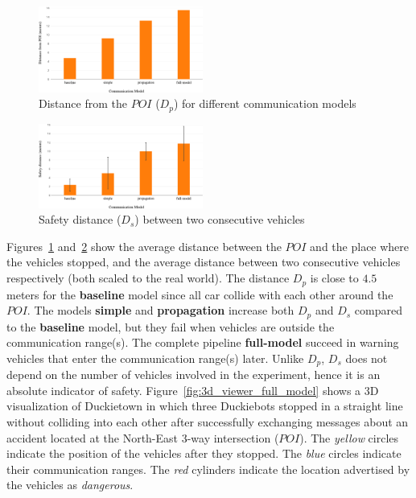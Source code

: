 \begin{figure}[t]
    \centering
    \includegraphics[width=0.48\textwidth, height=0.24\textwidth]{figures/distance_from_POI.pdf}
    \caption{Distance from the $POI$ ($D_p$) for different communication models \label{fig:distance_from_poi}}
\end{figure}

\begin{figure}[t]
    \centering
    \includegraphics[width=0.48\textwidth, height=0.24\textwidth]{figures/safety_distance.pdf}
    \caption{Safety distance ($D_s$) between two consecutive vehicles \label{fig:safety_distance}}
\end{figure}

Figures~\ref{fig:distance_from_poi} and~\ref{fig:safety_distance} show the average distance 
between the $POI$ and the place where the vehicles stopped, and the average distance 
between two consecutive vehicles respectively (both scaled to the real world).
The distance $D_p$ is close to $4.5$ meters for the \textbf{baseline} model since all car collide with each 
other around the $POI$. The models \textbf{simple} and \textbf{propagation} increase both 
$D_p$ and $D_s$ compared to the \textbf{baseline} model, but they fail when vehicles are outside the communication range(s).
The complete pipeline \textbf{full-model} succeed in warning vehicles that enter the communication range(s) later.
Unlike $D_p$, $D_s$ does not depend on the number of vehicles involved in the experiment, hence it 
is an absolute indicator of safety. Figure~\ref{fig:3d_viewer_full_model} shows a 3D visualization of Duckietown
in which three Duckiebots stopped in a straight line without colliding into each other
after successfully exchanging messages about an accident located at the North-East 3-way intersection ($POI$).
The \textit{yellow} circles indicate the position of the vehicles after they stopped. 
The \textit{blue} circles indicate their communication ranges. The \textit{red} cylinders 
indicate the location advertised by the vehicles as \textit{dangerous}.


